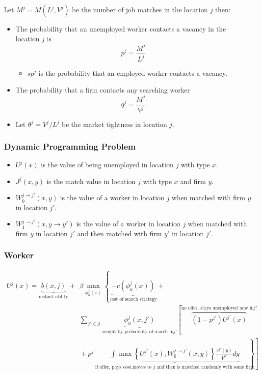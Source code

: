 \documentclass[
  letterpaper,
  DIV=11,
  numbers=noendperiod]{scrartcl}
\providecommand{\tightlist}{%
  \setlength{\itemsep}{0pt}\setlength{\parskip}{0pt}}\usepackage{longtable,booktabs,array}
\begin{document}
Let \(M^j = M(L^j, V^j)\) be the number of job matches in the location
\(j\) then:

\begin{itemize}
\tightlist
\item
  The probability that an unemployed worker contacts a vacancy in the
  location \(j\) is \[p^j = \frac{M^j}{L^j}\]

  \begin{itemize}
  \tightlist
  \item
    \(sp^j\) is the probability that an employed worker contacts a
    vacancy.
  \end{itemize}
\item
  The probability that a ﬁrm contacts any searching worker
  \[q^j = \frac{M^j}{V^j}\]
\item
  Let \(\theta^j = V^j / L^j\) be the market tightness in location
  \(j\).
\end{itemize}

\hypertarget{dynamic-programming-problem}{%
\subsubsection{Dynamic Programming
Problem}\label{dynamic-programming-problem}}

\begin{itemize}
\tightlist
\item
  \(U^{j}(x)\) is the value of being unemployed in location \(j\) with
  type \(x\).
\item
  \(J^{j}(x,y)\) is the match value in location \(j\) with type \(x\)
  and firm \(y\).
\item
  \(W^{j \to j'}_{0}(x,y)\) is the value of a worker in location \(j\)
  when matched with firm \(y\) in location \(j'\).
\item
  \(W^{j \to j'}_{1}(x,y\to y')\) is the value of a worker in location
  \(j\) when matched with firm \(y\) in location \(j'\) and then matched
  with firm \(y'\) in location \(j'\).
\end{itemize}

\hypertarget{worker}{%
\subsubsection{Worker}\label{worker}}

\begin{align*}
U^{j}(x) = \underbrace{b(x,j)}_{\text{instant utility}} + &\beta\max_{\phi^j_u(x)}\left\{ \underbrace{-c(\phi^j_u(x))}_{\text{cost of search strategy}} \right.  + \\
& \sum_{j'\in \mathcal{J}} \underbrace{\phi^j_u(x, j')}_{\text{weight by probability of search in} j'}\left[ \overbrace{(1-p^{j'})U^{j'}(x)}^{\text{no offer, stays unemployed now in} j'} \right.  \\
& \left. \left. \hspace{0cm} + p^{j'} \underbrace{\int \max\left\{U^{j'}(x),W^{j\to j'}_{0}(x,y)\right\}\frac{v^{j'}(y)}{V^{j'}}dy}_{\text{if offer, pays cost,moves to } j \text{ and then is matched randomly with some firm}} \right] \right\} 
\end{align*}
\end{document}
